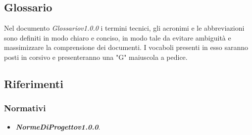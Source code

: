 \subsection{Glossario}
	Nel documento \textit{Glossario\textunderscore v1.0.0} i termini tecnici, gli acronimi e le abbreviazioni sono definiti in modo chiaro e conciso, in modo tale da evitare ambiguità e massimizzare la comprensione dei documenti.
	\newline \newline I vocaboli presenti in esso saranno posti in corsivo e presenteranno una "G" maiuscola a pedice.
	
\subsection{Riferimenti}
	\subsubsection{Normativi}
		\begin{itemize}
			\item \textbf{\textit{NormeDiProgetto\textunderscore v1.0.0}}.
		\end{itemize}
	
